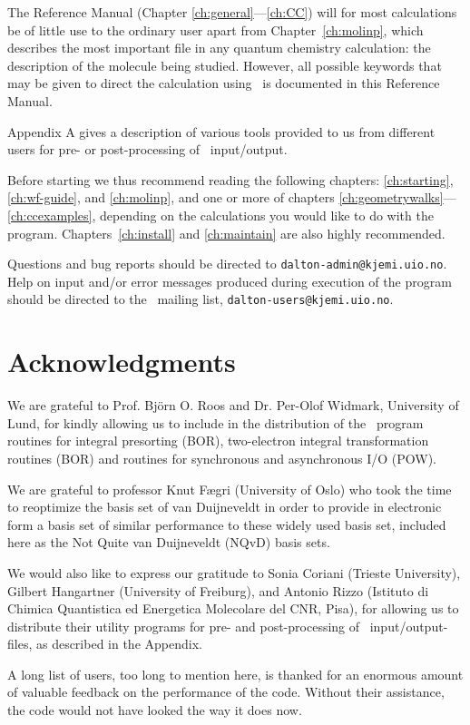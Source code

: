 \begin{description}
\item The Reference Manual (Chapter \ref{ch:general}---\ref{ch:CC})
will for most calculations be of 
little use to the ordinary user apart from Chapter~\ref{ch:molinp},
which describes
the most important file in any quantum chemistry calculation: the
description of the molecule being studied. However, all possible
keywords that may be given to direct the calculation using \dalton\ is
documented in this Reference Manual.

\item Appendix A gives a description of various tools provided to us
from different users for pre- or post-processing of \dalton\
input/output.
\end{description}

Before starting we thus recommend reading
the following chapters: \ref{ch:starting}, \ref{ch:wf-guide}, and
\ref{ch:molinp}, and one or more of chapters
\ref{ch:geometrywalks}---\ref{ch:ccexamples}, depending on the
calculations you would like to do with the
program. Chapters~\ref{ch:install} and \ref{ch:maintain} are also
highly recommended.

Questions and bug reports should be
directed to \verb|dalton-admin@kjemi.uio.no|. Help on input and/or
error messages produced during execution of the program should be
directed to the \dalton\ mailing list\index{mailing list},
\verb|dalton-users@kjemi.uio.no|.

\section{Acknowledgments}

We are grateful to Prof. Bj\"{o}rn O. Roos and Dr. Per-Olof
Widmark, University of Lund, for kindly allowing us to include in
the distribution of the \dalton\ program routines for integral
presorting (BOR), two-electron integral
transformation routines\index{integral transformation} (BOR) and
routines for synchronous and asynchronous I/O (POW). 

We are grateful to professor Knut F\ae gri (University of Oslo) who
took the time to reoptimize the basis set of van Duijneveldt in order
to provide in electronic form a basis set of similar performance to
these widely used basis set, included here as the Not Quite van
Duijneveldt (NQvD) basis sets.

We would also like to express our gratitude to Sonia Coriani (Trieste
University), Gilbert Hangartner (University of Freiburg), and Antonio
Rizzo (Istituto di Chimica Quantistica ed Energetica Molecolare del
CNR, Pisa), for allowing us to distribute their utility programs for
pre- and post-processing of \dalton\ input/output-files, as described
in the Appendix.

A long list of users, too long to mention here, is thanked for an
enormous amount of valuable feedback on the performance of the
code. Without their assistance, the code would not have looked the
way it does now.
